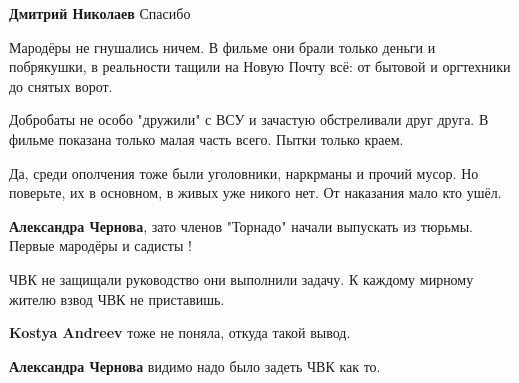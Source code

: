 \begin{itemize}
\begin{itemize}
\textbf{Дмитрий Николаев} Спасибо

\end{itemize}


Мародёры не гнушались ничем. В фильме они брали только деньги и побрякушки, в
реальности тащили на Новую Почту всё: от бытовой и оргтехники до снятых ворот.

Добробаты не особо "дружили" с ВСУ и зачастую обстреливали друг друга. В фильме
показана только малая часть всего. Пытки только краем. 

Да, среди ополчения тоже были уголовники, наркрманы и прочий мусор. Но
поверьте, их в основном, в живых уже никого нет. От наказания мало кто ушёл.

\begin{itemize}
 
\textbf{Александра Чернова}, зато членов "Торнадо" начали выпускать из тюрьмы. Первые мародёры и садисты !
\end{itemize}

 
ЧВК не защищали руководство они выполнили задачу. К каждому мирному жителю
взвод ЧВК не приставишь.

\begin{itemize}
 
\textbf{Kostya Andreev} тоже не поняла, откуда такой вывод.

 
\textbf{Александра Чернова} видимо надо было задеть ЧВК как то.


\end{itemize}
\end{itemize}
